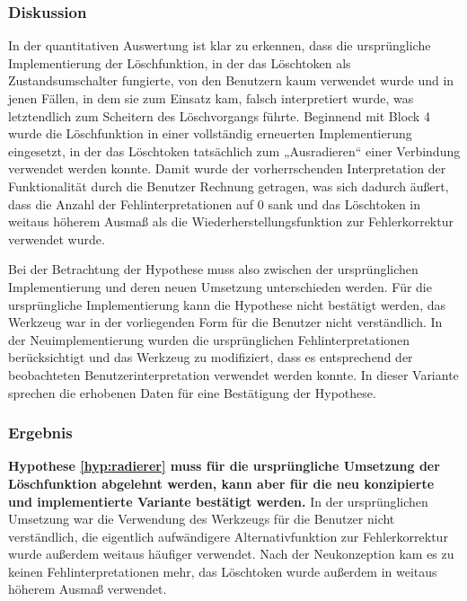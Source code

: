 \subsubsection{Diskussion} %

In der quantitativen Auswertung ist klar zu erkennen, dass die ursprüngliche Implementierung der Löschfunktion, in der das Löschtoken als Zustandsumschalter fungierte, von den Benutzern kaum verwendet wurde und in jenen Fällen, in dem sie zum Einsatz kam, falsch interpretiert wurde, was letztendlich zum Scheitern des Löschvorgangs führte. Beginnend mit Block 4 wurde die Löschfunktion in einer vollständig erneuerten Implementierung eingesetzt, in der das Löschtoken tatsächlich zum „Ausradieren“ einer Verbindung verwendet werden konnte. Damit wurde der vorherrschenden Interpretation der Funktionalität durch die Benutzer Rechnung getragen, was sich dadurch äußert, dass die Anzahl der Fehlinterpretationen auf 0 sank und das Löschtoken in weitaus höherem Ausmaß als die Wiederherstellungsfunktion zur Fehlerkorrektur verwendet wurde.

Bei der Betrachtung der Hypothese muss also zwischen der ursprünglichen Implementierung und deren neuen Umsetzung unterschieden werden. Für die ursprüngliche Implementierung kann die Hypothese nicht bestätigt werden, das Werkzeug war in der vorliegenden Form für die Benutzer nicht verständlich. In der Neuimplementierung wurden die ursprünglichen Fehlinterpretationen berücksichtigt und das Werkzeug zu modifiziert, dass es entsprechend der beobachteten Benutzerinterpretation verwendet werden konnte. In dieser Variante sprechen die erhobenen Daten für eine Bestätigung der Hypothese.

\subsubsection{Ergebnis} %

\textbf{Hypothese \ref{hyp:radierer} muss für die ursprüngliche Umsetzung der Löschfunktion abgelehnt werden, kann aber für die neu konzipierte und implementierte Variante bestätigt werden.} In der ursprünglichen Umsetzung war die Verwendung des Werkzeugs für die Benutzer nicht verständlich, die eigentlich aufwändigere Alternativfunktion zur Fehlerkorrektur wurde außerdem weitaus häufiger verwendet. Nach der Neukonzeption kam es zu keinen Fehlinterpretationen mehr, das Löschtoken wurde außerdem in weitaus höherem Ausmaß verwendet.


